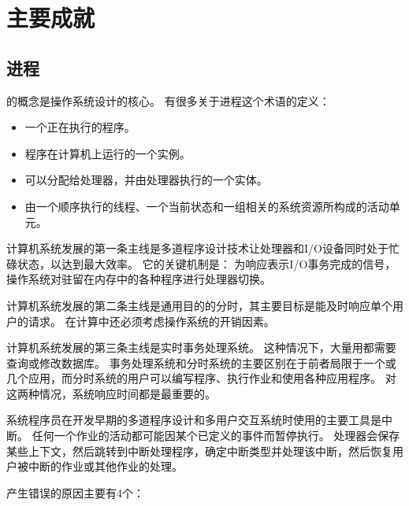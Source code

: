 
\section{主要成就}
{
    \subsection{进程}
    {
        的概念是操作系统设计的核心。
        有很多关于进程这个术语的定义：

        \begin{itemize}
            \item 一个正在执行的程序。
            \item 程序在计算机上运行的一个实例。
            \item 可以分配给处理器，并由处理器执行的一个实体。
            \item 由一个顺序执行的线程、一个当前状态和一组相关的系统资源所构成的活动单元。
        \end{itemize}

        计算机系统发展的第一条主线是多道程序设计技术让处理器和I/O设备同时处于忙碌状态，以达到最大效率。
        它的关键机制是：
        为响应表示I/O事务完成的信号，操作系统对驻留在内存中的各种程序进行处理器切换。

        计算机系统发展的第二条主线是通用目的的分时，其主要目标是能及时响应单个用户的请求。
        在计算中还必须考虑操作系统的开销因素。

        计算机系统发展的第三条主线是实时事务处理系统。
        这种情况下，大量用都需要查询或修改数据库。
        事务处理系统和分时系统的主要区别在于前者局限于一个或几个应用，而分时系统的用户可以编写程序、执行作业和使用各种应用程序。
        对这两种情况，系统响应时间都是最重要的。

        系统程序员在开发早期的多道程序设计和多用户交互系统时使用的主要工具是中断。
        任何一个作业的活动都可能因某个已定义的事件而暂停执行。
        处理器会保存某些上下文，然后跳转到中断处理程序，确定中断类型并处理该中断，然后恢复用户被中断的作业或其他作业的处理。

        产生错误的原因主要有4个：

}}
